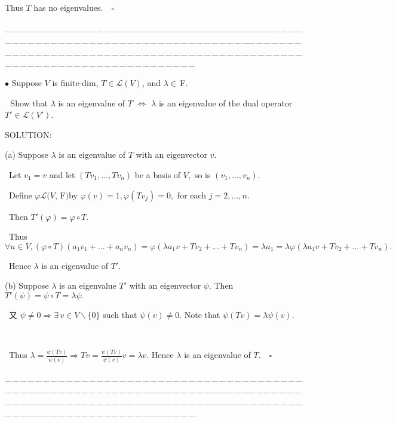 \documentclass[a4paper, 11pt, UTF8]{article}
\def\Lm{\mathcal{L}}
\def\Fbfc{$\,{\timesbf F}$}
\begin{document}
\begin{large}
Thus $T$ has no eigenvalues.$\quad\square$\par
{\tiny \_\,\_\,\_\,\_\,\_\,\_\,\_\,\_\,\_\,\_\,\_\,\_\,\_\,\_\,\_\,\_\,\_\,\_\,\_\,\_\,\_\,\_\,\_\,\_\,\_\,\_\,\_\,\_\,\_\,\_\,\_\,\_\,\_\,\_\,\_\,\_\,\_\,\_\,\_\,\_\,\_\,\_\,\_\,\_\,\_\,\_\,\_\,\_\,\_\,\_\,\_\,\_\,\_\,\_\,\_\,\_\,\_\,\_\,\_\,\_\,\_\,\_\,\_\,\_\,\_\,\_\,\_\,\_\,\_\,\_\,\_\_\,\_\,\_\,\_\,\_\,\_\,\_\,\_\,\_\,\_\,\_\,\_\,\_\,\_\,\_\,\_\,\_\,\_\,\_\,\_\,\_\,\_\,\_\,\_\,\_\,\_\,\_\,\_\,\_\,\_\,\_\,\_\,\_\,\_\,\_\,\_\,\_\,\_\,\_\,\_\,\_\,\_\,\_\,\_\,\_\,\_\,\_\,\_\,\_\,\_\,\_\,\_\,\_\,\_\,\_\,\_\,\_\,\_\,\_\,\_\,\_\,\_\,\_\,\_\,\_\,\_\,\_\,\_\,\_\,\_\,\_}\par

{\small $\bullet$} {\timessl\Large
Suppose $V$ is finite-dim, $T\in\Lm(V)$, and $\lambda\in\Fbfc.$
}\par\,\,
{\timessl\Large Show that $\lambda$ is an eigenvalue of $T$ $\Longleftrightarrow$ $\lambda$ is an eigenvalue of the dual operator $T'\in\Lm(V')$. 
}\par
{\timesbf S\footnotesize{OLUTION:}}\par\quad
(a) Suppose $\lambda$ is an eigenvalue of $T$ with an eigenvector $v$.\par\qquad\,
Let $v_1=v$ and let $(Tv_1,\dots,Tv_n)$ be a basis of $V,$ so is $(v_1,\dots,v_n).$\par\qquad\,
Define $\varphi\Lm(V,\Fbfc)$by $\varphi(v)=1,\varphi(Tv_j)=0,$ for each $j=2,\dots,n.$\par\qquad\,
Then $T'(\varphi)=\varphi\circ T.$\par\qquad\,
Thus $\forall u\in V,(\varphi\circ T)(a_1 v_1+\dots+a_n v_n)=\varphi(\lambda a_1 v+Tv_2+\dots+Tv_n)=\lambda a_1=\lambda\varphi(\lambda a_1 v+Tv_2+\dots+Tv_n).$\par\qquad\,
Hence $\lambda$ is an eigenvalue of $T'.$\par\quad
(b) Suppose $\lambda$ is an eigenvalue $T'$ with an eigenvector $\psi.$ Then $T'(\psi)=\psi\circ T=\lambda\psi.$\par\qquad\,
又 $\psi\neq 0\Rightarrow\exists\,v\in V\backslash\{0\}$ such that $\psi(v)\neq 0.$ Note that $\psi(Tv)=\lambda\psi(v).$\par{\tiny\,\par}\qquad\,
Thus $\lambda=\displaystyle\frac{\psi(Tv)}{\psi(v)}\Rightarrow Tv=\frac{\psi(Tv)}{\psi(v)}v=\lambda v.$
Hence $\lambda$ is an eigenvalue of $T.\quad\square$\par
{\tiny \_\,\_\,\_\,\_\,\_\,\_\,\_\,\_\,\_\,\_\,\_\,\_\,\_\,\_\,\_\,\_\,\_\,\_\,\_\,\_\,\_\,\_\,\_\,\_\,\_\,\_\,\_\,\_\,\_\,\_\,\_\,\_\,\_\,\_\,\_\,\_\,\_\,\_\,\_\,\_\,\_\,\_\,\_\,\_\,\_\,\_\,\_\,\_\,\_\,\_\,\_\,\_\,\_\,\_\,\_\,\_\,\_\,\_\,\_\,\_\,\_\,\_\,\_\,\_\,\_\,\_\,\_\,\_\,\_\,\_\,\_\_\,\_\,\_\,\_\,\_\,\_\,\_\,\_\,\_\,\_\,\_\,\_\,\_\,\_\,\_\,\_\,\_\,\_\,\_\,\_\,\_\,\_\,\_\,\_\,\_\,\_\,\_\,\_\,\_\,\_\,\_\,\_\,\_\,\_\,\_\,\_\,\_\,\_\,\_\,\_\,\_\,\_\,\_\,\_\,\_\,\_\,\_\,\_\,\_\,\_\,\_\,\_\,\_\,\_\,\_\,\_\,\_\,\_\,\_\,\_\,\_\,\_\,\_\,\_\,\_\,\_\,\_\,\_\,\_\,\_\,\_}\par


\end{large}
\end{document}
